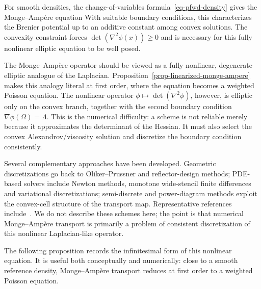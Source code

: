 For smooth densities, the change-of-variables formula~\eqref{eq-pfwd-density} gives the Monge--Amp\`ere equation
With suitable boundary conditions, this characterizes the Brenier potential up to an additive constant among convex solutions. The convexity constraint forces $\det(\nabla^2\phi(x))\geq0$ and is necessary for this fully nonlinear elliptic equation to be well posed.

\begin{rem}
	The Monge--Amp\`ere operator should be viewed as a fully nonlinear, degenerate elliptic analogue of the Laplacian. Proposition~\ref{prop-linearized-monge-ampere} makes this analogy literal at first order, where the equation becomes a weighted Poisson equation. The nonlinear operator $\phi\mapsto\det(\nabla^2\phi)$, however, is elliptic only on the convex branch, together with the second boundary condition $\nabla\phi(\Omega)=\Lambda$. This is the numerical difficulty: a scheme is not reliable merely because it approximates the determinant of the Hessian. It must also select the convex Alexandrov/viscosity solution and discretize the boundary condition consistently.

	Several complementary approaches have been developed. Geometric discretizations go back to Oliker--Prussner and reflector-design methods; PDE-based solvers include Newton methods, monotone wide-stencil finite differences and variational discretizations; semi-discrete and power-diagram methods exploit the convex-cell structure of the transport map. Representative references include~\cite{oliker1989numerical,caffarelli1999problem,Loeper:2005fn,benamou2014numerical,froese2011convergent,benamou2016monotone,mirebeau2015discretization,sulman2011efficient}. We do not describe these schemes here; the point is that numerical Monge--Amp\`ere transport is primarily a problem of consistent discretization of this nonlinear Laplacian-like operator.
\end{rem}

The following proposition records the infinitesimal form of this nonlinear equation. It is useful both conceptually and numerically: close to a smooth reference density, Monge--Amp\`ere transport reduces at first order to a weighted Poisson equation.

